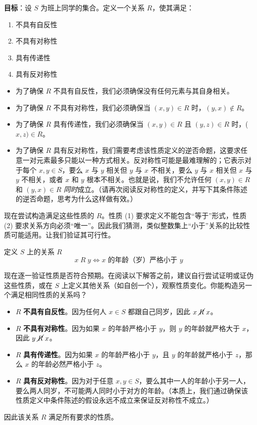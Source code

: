 \begin{example}\label{ex:example6.2.17}
    \textbf{目标}：设 $S$ 为班上同学的集合。定义一个关系 $R$，使其满足：
    \begin{enumerate}[label=(\arabic*)]
        \item 不具有自反性
        \item 不具有对称性
        \item 具有传递性
        \item 具有反对称性
    \end{enumerate}
    \begin{itemize}
        \item 为了确保 $R$ 不具有自反性，我们必须确保没有任何元素与其自身相关。
        \item 为了确保 $R$ 不具有对称性，我们必须确保当 $(x, y) \in R$ 时，$(y, x) \notin R$。
        \item 为了确保 $R$ 具有传递性，我们必须确保当 $(x, y) \in R$ 且 $(y, z) \in R$ 时，($x, z) \in R$。
        \item 为了确保 $R$ 具有反对称性，我们需要考虑该性质定义的逆否命题，这要求任意一对元素最多只能以一种方式相关。反对称性可能是最难理解的；它表示对于每个 $x, y \in S$，要么 $x$ 与 $y$ 相关但 $y$ 与 $x$ 不相关，要么 $y$ 与 $x$ 相关但 $x$ 与 $y$ 不相关，或者 $x$ 和 $y$ 根本不相关。也就是说，我们不允许任何 $(x, y) \in R$ 和 $(y, x) \in R$ \emph{同时}成立。（请再次阅读反对称性的定义，并写下其条件陈述的逆否命题，思考为什么这样做有效。）
    \end{itemize}
    
    现在尝试构造满足这些性质的 $R$。性质 (1) 要求定义不能包含``等于''形式，性质 (2) 要求关系方向必须``唯一''。因此我们猜测，类似整数集上``小于''关系的比较性质可能适用。让我们验证其可行性。

    定义 $S$ 上的关系 $R$
    \[x \;R\; y \iff x \text{\ 的年龄（岁）严格小于\ } y\]

    现在逐一验证性质是否符合预期。在阅读以下解答之前，建议自行尝试证明或证伪这些性质，或在 $S$ 上定义其他关系（如自创一个），观察性质变化。你能构造另一个满足相同性质的关系吗？

    \begin{itemize}
        \item $R$ \textbf{不具有自反性}。因为任何人 $x \in S$ 都跟自己同岁，因此 $x \;\cancel{R}\; x$。
        \item $R$ \textbf{不具有对称性}。因为如果 $x$ 的年龄严格小于 $y$，则 $y$ 的年龄就严格大于 $x$，因此 $y \;\cancel{R}\; x$。
        \item $R$ \textbf{具有传递性}。因为如果 $x$ 的年龄严格小于 $y$，且 $y$ 的年龄就严格小于 $z$，那么 $x$ 的年龄必然严格小于 $z$。
        \item $R$ \textbf{具有反对称性}。因为对于任意 $x, y \in S$，要么其中一人的年龄小于另一人，要么两人同岁，不可能两人同时小于对方的年龄。（本质上，我们通过确保该性质定义中条件陈述的假设永远不成立来保证反对称性不成立。）
    \end{itemize}

    因此该关系 $R$ 满足所有要求的性质。
\end{example}

